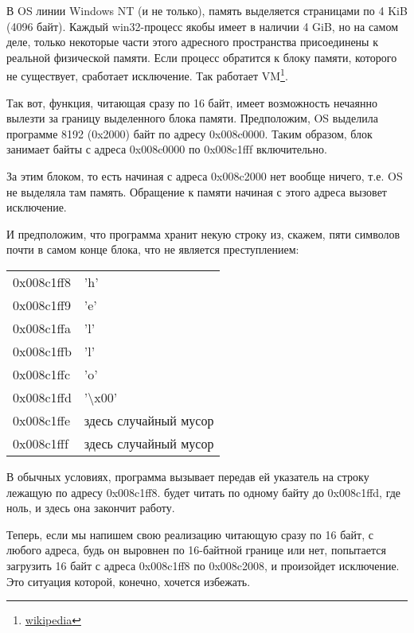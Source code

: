\newcommand{\URLPAGE}{\href{http://go.yurichev.com/17136}{wikipedia}}

В \ac{OS} линии \gls{Windows NT} (и не только), память выделяется страницами по 4 KiB (4096 байт). 
Каждый win32-процесс якобы имеет в наличии 4 GiB, но на самом деле, 
только некоторые части этого адресного пространства присоединены к реальной физической памяти. 
Если процесс обратится к блоку памяти, которого не существует, сработает исключение. 
Так работает \ac{VM}\footnote{\URLPAGE}.

Так вот, функция, читающая сразу по 16 байт, имеет возможность нечаянно вылезти за границу 
выделенного блока памяти. 
Предположим, \ac{OS} выделила программе 8192 (0x2000) байт по адресу 0x008c0000. 
Таким образом, блок занимает байты с адреса 0x008c0000 по 0x008c1fff включительно.

За этим блоком, то есть начиная с адреса 0x008c2000 нет вообще ничего, т.е. \ac{OS} не выделяла там память. 
Обращение к памяти начиная с этого адреса вызовет исключение.

И предположим, что программа хранит некую строку из, скажем, пяти символов почти в самом конце блока, 
что не является преступлением:

\begin{center}
  \begin{tabular}{ | l | l | }
    \hline
        0x008c1ff8 & 'h' \\
        0x008c1ff9 & 'e' \\
        0x008c1ffa & 'l' \\
        0x008c1ffb & 'l' \\
        0x008c1ffc & 'o' \\
        0x008c1ffd & '\textbackslash{}x00' \\
        0x008c1ffe & здесь случайный мусор \\
        0x008c1fff & здесь случайный мусор \\
    \hline
  \end{tabular}
\end{center}

В обычных условиях, программа вызывает \strlen передав ей указатель на строку  
лежащую по адресу 0x008c1ff8. 
\strlen будет читать по одному байту до 0x008c1ffd, где ноль, и здесь она закончит работу.

Теперь, если мы напишем свою реализацию \strlen читающую сразу по 16 байт, с любого адреса, 
будь он выровнен по 16-байтной границе или нет, 
\MOVDQU попытается загрузить 16 байт с адреса 0x008c1ff8 по 0x008c2008, и произойдет исключение. 
Это ситуация которой, конечно, хочется избежать.

